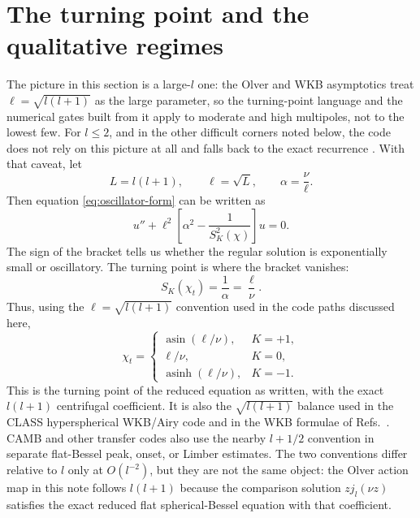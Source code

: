 \documentclass[11pt,a4paper]{article}
\newcommand{\code}[1]{\texttt{\detokenize{#1}}}
\newcommand{\SK}{S_K}
\newcommand{\asinh}{\operatorname{asinh}}
\newcommand{\asin}{\operatorname{asin}}
\begin{document}
\section{The turning point and the qualitative regimes}

The picture in this section is a large-\(l\) one: the Olver and WKB asymptotics
treat \(\ell=\sqrt{l(l+1)}\) as the large parameter, so the turning-point
language and the numerical gates built from it apply to moderate and high
multipoles, not to the lowest few.  For \(l\le2\), and in the other difficult
corners noted below, the code does not rely on this picture at all and falls
back to the exact recurrence \code{phi_recurs}.  With that caveat, let
\begin{equation}
  L=l(l+1),\qquad \ell=\sqrt{L},\qquad \alpha=\frac{\nu}{\ell}.
\end{equation}
Then equation \eqref{eq:oscillator-form} can be written as
\begin{equation}
  u''+\ell^2\left[\alpha^2-\frac{1}{\SK^2(\chi)}\right]u=0.
\end{equation}
The sign of the bracket tells us whether the regular solution is exponentially small or oscillatory.  The turning point is where the bracket vanishes:
\begin{equation}
  \SK(\chi_t)=\frac{1}{\alpha}=\frac{\ell}{\nu}.
  \label{eq:turning-condition}
\end{equation}
Thus, using the \(\ell=\sqrt{l(l+1)}\) convention used in the code paths discussed here,
\begin{equation}
  \chi_t=
  \begin{cases}
    \asin(\ell/\nu), & K=+1,\\
    \ell/\nu, & K=0,\\
    \asinh(\ell/\nu), & K=-1.
  \end{cases}
  \label{eq:turning-chi}
\end{equation}
This is the turning point of the reduced equation as written, with the exact
\(l(l+1)\) centrifugal coefficient.  It is also the
\(\sqrt{l(l+1)}\) balance used in the \textsc{CLASS} hyperspherical WKB/Airy
code and in the WKB formulae of Refs.~\cite{kosowsky1998,tram2013}.  CAMB and
other transfer codes also use the nearby \(l+1/2\) convention in separate
flat-Bessel peak, onset, or Limber estimates.  The two conventions differ
relative to \(l\) only at \(O(l^{-2})\), but they are not the same object: the
Olver action map in this note follows \(l(l+1)\) because the comparison solution
\(zj_l(\nu z)\) satisfies the exact reduced flat spherical-Bessel equation with
that coefficient.
\end{document}
